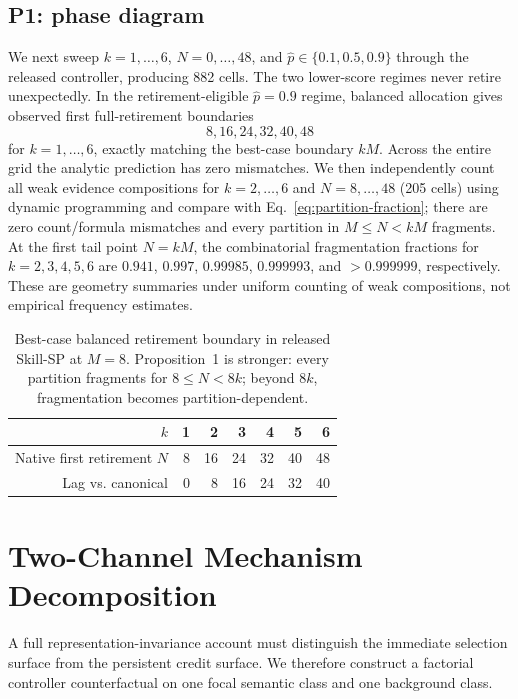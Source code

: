 \subsection{P1: phase diagram}

We next sweep $k=1,\ldots,6$, $N=0,\ldots,48$, and $\hat p\in\{0.1,0.5,0.9\}$ through the released controller, producing 882 cells. The two lower-score regimes never retire unexpectedly. In the retirement-eligible $\hat p=0.9$ regime, balanced allocation gives observed first full-retirement boundaries
\[
8,16,24,32,40,48
\]
for $k=1,\ldots,6$, exactly matching the best-case boundary $kM$. Across the entire grid the analytic prediction has zero mismatches. We then independently count all weak evidence compositions for $k=2,\ldots,6$ and $N=8,\ldots,48$ (205 cells) using dynamic programming and compare with Eq.~\ref{eq:partition-fraction}; there are zero count/formula mismatches and every partition in $M\le N<kM$ fragments. At the first tail point $N=kM$, the combinatorial fragmentation fractions for $k=2,3,4,5,6$ are $0.941$, $0.997$, $0.99985$, $0.999993$, and $>0.999999$, respectively. These are geometry summaries under uniform counting of weak compositions, not empirical frequency estimates.

\begin{table}[t]
\centering
\caption{Best-case balanced retirement boundary in released Skill-SP at $M=8$. Proposition~1 is stronger: every partition fragments for $8\le N<8k$; beyond $8k$, fragmentation becomes partition-dependent.}
\label{tab:phase}
\small
\setlength{\tabcolsep}{5pt}
\begin{tabular}{rrrrrrr}
\toprule
$k$ & 1 & 2 & 3 & 4 & 5 & 6\\
\midrule
Native first retirement $N$ & 8 & 16 & 24 & 32 & 40 & 48\\
Lag vs. canonical & 0 & 8 & 16 & 24 & 32 & 40\\
\bottomrule
\end{tabular}
\end{table}

\section{Two-Channel Mechanism Decomposition}

A full representation-invariance account must distinguish the immediate selection surface from the persistent credit surface. We therefore construct a factorial controller counterfactual on one focal semantic class and one background class.

